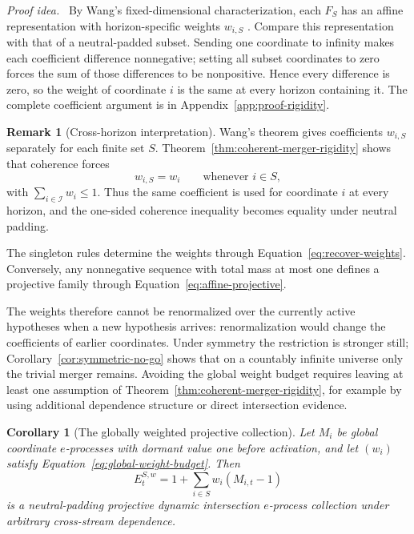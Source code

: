 \documentclass[11pt]{article}
\numberwithin{equation}{section}
\theoremstyle{plain}
\newtheorem{corollary}[theorem]{Corollary}
\theoremstyle{definition}
\newtheorem{remark}[theorem]{Remark}
\newcommand{\Iuniv}{\mathcal I}
\newcommand{\proofidea}{\par\medskip\noindent\textit{Proof idea.}\ }
\begin{document}
\proofidea
By Wang's fixed-dimensional characterization, each $F_S$ has an affine representation with horizon-specific weights $w_{i,S}$ \citep{Wang2025Merging}. Compare this representation with that of a neutral-padded subset. Sending one coordinate to infinity makes each coefficient difference nonnegative; setting all subset coordinates to zero forces the sum of those differences to be nonpositive. Hence every difference is zero, so the weight of coordinate $i$ is the same at every horizon containing it. The complete coefficient argument is in Appendix~\ref{app:proof-rigidity}.

\begin{remark}[Cross-horizon interpretation]\label{rem:wang-comparison}
Wang's theorem gives coefficients $w_{i,S}$ separately for each finite set $S$. Theorem~\ref{thm:coherent-merger-rigidity} shows that coherence forces
\[
  w_{i,S}=w_i\qquad\text{whenever }i\in S,
\]
with $\sum_{i\in\Iuniv}w_i\leq1$. Thus the same coefficient is used for coordinate $i$ at every horizon, and the one-sided coherence inequality becomes equality under neutral padding.
\end{remark}

The singleton rules determine the weights through Equation~\eqref{eq:recover-weights}. Conversely, any nonnegative sequence with total mass at most one defines a projective family through Equation~\eqref{eq:affine-projective}.

The weights therefore cannot be renormalized over the currently active hypotheses when a new hypothesis arrives: renormalization would change the coefficients of earlier coordinates. Under symmetry the restriction is stronger still; Corollary~\ref{cor:symmetric-no-go} shows that on a countably infinite universe only the trivial merger remains. Avoiding the global weight budget requires leaving at least one assumption of Theorem~\ref{thm:coherent-merger-rigidity}, for example by using additional dependence structure or direct intersection evidence.

\begin{corollary}[The globally weighted projective collection]\label{cor:weighted-projective}
Let $M_i$ be global coordinate $e$-processes with dormant value one before activation, and let $(w_i)$ satisfy Equation~\eqref{eq:global-weight-budget}. Then
\begin{equation}\label{eq:weighted-system}
  E_t^{S,w}=1+\sum_{i\in S}w_i(M_{i,t}-1)
\end{equation}
is a neutral-padding projective dynamic intersection $e$-process collection under arbitrary cross-stream dependence.
\end{corollary}
\end{document}
